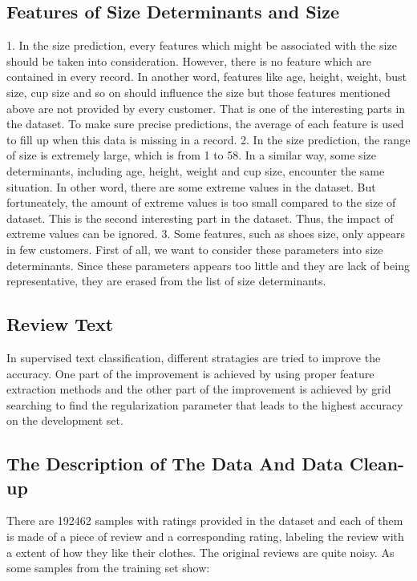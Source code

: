 \documentclass[letterpaper, 10 pt, conference]{ieeeconf}  %
\begin{document}
	\subsection{Features of Size Determinants and Size} 
	1. In the size prediction, every features which might be associated with the size should be taken into consideration. However, there is no feature which are contained in every record. In another word, features like age, height, weight, bust size, cup size and so on should influence the size but those features mentioned above are not provided by every customer. That is one of the interesting parts in the dataset. To make sure precise predictions, the average of each feature is used to fill up when this data is missing in a record.
	2. In the size prediction, the range of size is extremely large, which is from 1 to 58. In a similar way, some size determinants, including age, height, weight and cup size, encounter the same situation. In other word, there are some extreme values in the dataset. But fortuneately, the amount of extreme values is too small compared to the size of dataset. This is the second interesting part in the dataset. Thus, the impact of extreme values can be ignored.
	3. Some features, such as shoes size, only appears in few customers. First of all, we want to consider these parameters into size determinants. Since these parameters appears too little and they are lack of being representative, they are erased from the list of size determinants.

	\subsection{Review Text}
	In supervised text classification, different stratagies are tried to improve the accuracy. One part of the improvement is achieved by using proper feature extraction methods and the other part of the improvement is achieved by grid searching to find the regularization parameter that leads to the highest accuracy on the development set.
	
	
\subsection{The Description of The Data And Data Clean-up}

There are 192462 samples with ratings provided in the dataset and each of them is made of a piece of review and a corresponding rating, labeling the review with a extent of how they like their clothes.
The original reviews are quite noisy. As some samples from the training set show:
\end{document}
